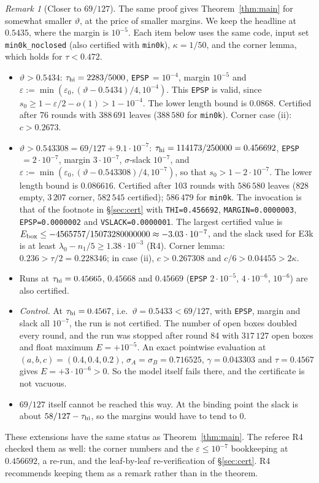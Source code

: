 \documentclass[11pt]{amsart}
\theoremstyle{definition}
\theoremstyle{remark}
\newtheorem{remark}[theorem]{Remark}
\newcommand{\e}{\varepsilon}
\begin{document}
\begin{remark}[Closer to $69/127$]\label{rem:543308}
The same proof gives Theorem~\ref{thm:main} for somewhat smaller $\vartheta$, at the price of smaller margins. We keep the headline at
$0.5435$, where the margin is $10^{-5}$. Each item below uses the same code, input set \texttt{min0k\_noclosed} (also certified with \texttt{min0k}), $\kappa=1/50$,
and the corner lemma, which holds for $\tau<0.472$.
\begin{itemize}[leftmargin=*]
\item $\vartheta>0.5434$: $\tau_{\rm hi}=2283/5000$, \texttt{EPSP}$\,=10^{-4}$, margin $10^{-5}$ and $\e:=\min(\e_0,(\vartheta-0.5434)/4,10^{-4})$.
This \texttt{EPSP} is valid, since $s_0\ge1-\e/2-o(1)>1-10^{-4}$. The lower length bound is $0.0868$. Certified after 76 rounds with $388\,691$ leaves
($388\,580$ for \texttt{min0k}). Corner case (ii): $c>0.2673$.
\item $\vartheta>0.543308=69/127+9.1\cdot10^{-7}$: $\tau_{\rm hi}=114173/250000=0.456692$, \texttt{EPSP}$\,=2\cdot10^{-7}$, margin $3\cdot10^{-7}$,
$\sigma$-slack $10^{-7}$, and $\e:=\min(\e_0,(\vartheta-0.543308)/4,10^{-7})$, so that $s_0>1-2\cdot10^{-7}$. The lower length bound is $0.086616$.
Certified after 103 rounds with $586\,580$ leaves ($828$ empty, $3\,207$ corner, $582\,545$ certified); $586\,479$ for \texttt{min0k}.
The invocation is that of the footnote in \S\ref{sec:cert} with \texttt{THI=0.456692}, \texttt{MARGIN=0.0000003}, \texttt{EPSP=0.0000002} and
\texttt{VSLACK=0.0000001}. The largest certified value is $E_{\rm box}\le-4565757/15073280000000\approx-3.03\cdot10^{-7}$, and the slack used for E3k is at least
$\lambda_0-n_1/5\ge1.38\cdot10^{-3}$ (R4).
Corner lemma: $0.236>\tau/2=0.228346$; in case (ii), $c>0.267308$ and $c/6>0.04455>2\kappa$.
\item Runs at $\tau_{\rm hi}=0.45665$, $0.45668$ and $0.45669$ (\texttt{EPSP} $2\cdot10^{-5}$, $4\cdot10^{-6}$, $10^{-6}$) are also certified.
\item \emph{Control.} At $\tau_{\rm hi}=0.4567$, i.e.\ $\vartheta=0.5433<69/127$, with \texttt{EPSP}, margin and slack all $10^{-7}$, the run is not certified.
The number of open boxes doubled every round, and the run was stopped after round 84 with $317\,127$ open boxes and float maximum $E=+10^{-5}$.
An exact pointwise evaluation at $(a,b,c)=(0.4,0.4,0.2)$, $\sigma_A=\sigma_B=0.716525$, $\gamma=0.043303$ and $\tau=0.4567$ gives $E=+3\cdot10^{-6}>0$.
So the model itself fails there, and the certificate is not vacuous.
\item $69/127$ itself cannot be reached this way. At the binding point the slack is about $58/127-\tau_{\rm hi}$, so the margins would have to tend to $0$.
\end{itemize}
These extensions have the same status as Theorem~\ref{thm:main}. The referee R4 checked them as well: the corner numbers and the $\e\le10^{-7}$ bookkeeping
at $0.456692$, a re-run, and the leaf-by-leaf re-verification of \S\ref{sec:cert}. R4 recommends keeping them as a remark rather than in the theorem.
\end{remark}
\end{document}
